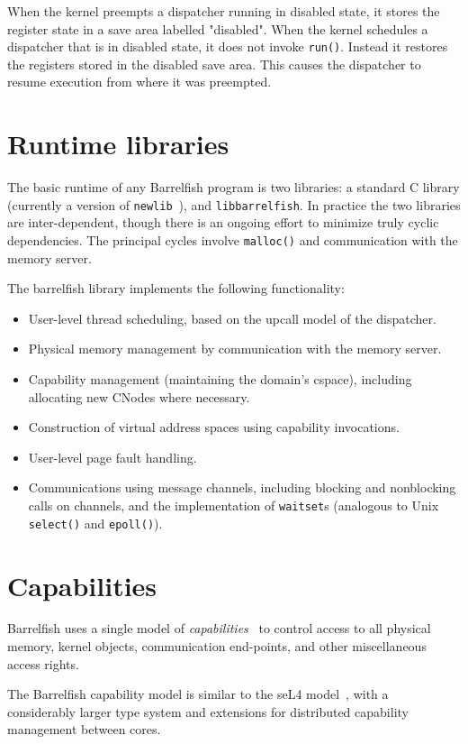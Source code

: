 \documentclass[a4paper,twoside]{report} %
\begin{document}
When the kernel preempts a dispatcher running in disabled state, it stores the
register state in a save area labelled "disabled". When the kernel schedules a
dispatcher that is in disabled state, it does not invoke \texttt{run()}. Instead
it restores the registers stored in the disabled save area. This causes the
dispatcher to resume execution from where it was preempted.

\section{Runtime libraries}

The basic runtime of any Barrelfish program is two libraries: a
standard C library (currently a version of
\texttt{newlib}~\cite{newlib}), and \texttt{libbarrelfish}.  In
practice the two libraries are inter-dependent, though there is an
ongoing effort to minimize truly cyclic dependencies.  The principal
cycles involve \texttt{malloc()} and communication with the memory
server. 

The barrelfish library implements the following functionality:
\begin{itemize}
\item User-level thread scheduling, based on the upcall model of the
  dispatcher.
\item Physical memory management by communication with the memory
  server. 
\item Capability management (maintaining the domain's cspace),
  including allocating new CNodes where necessary. 
\item Construction of virtual address spaces using capability
  invocations.
\item User-level page fault handling.
\item Communications using message channels, including blocking and
  nonblocking calls on channels, and the implementation of
  \texttt{waitset}s (analogous to Unix \texttt{select()} and
  \texttt{epoll()}). 
\end{itemize}

\section{Capabilities}

Barrelfish uses a single model of
\emph{capabilities}~\cite{hank:capabilities} to control access to all
physical memory, kernel objects, communication end-points, and other
miscellaneous access rights. 

The Barrelfish capability model is similar to the seL4
model~\cite{sel4:iies08}, with a considerably larger type system and
extensions for distributed capability management between cores. 
\end{document}
